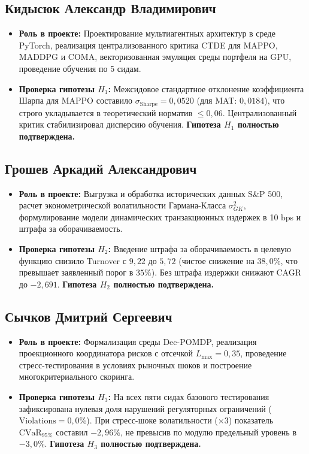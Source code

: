 \documentclass[11pt,a4paper]{article}
\begin{document}
\subsection{Кидысюк Александр Владимирович}
\begin{itemize}[leftmargin=*]
\item \textbf{Роль в проекте:} Проектирование мультиагентных архитектур в среде PyTorch, реализация централизованного критика CTDE для MAPPO, MADDPG и COMA, векторизованная эмуляция среды портфеля на GPU, проведение обучения по 5 сидам.
\item \textbf{Проверка гипотезы $H_1$:} Межсидовое стандартное отклонение коэффициента Шарпа для MAPPO составило $\sigma_{\text{Sharpe}} = 0{,}0520$ (для MAT: $0{,}0184$), что строго укладывается в теоретический норматив $\le 0{,}06$. Централизованный критик стабилизировал дисперсию обучения. \textbf{Гипотеза $H_1$ полностью подтверждена.}
\end{itemize}

\subsection{Грошев Аркадий Александрович}
\begin{itemize}[leftmargin=*]
\item \textbf{Роль в проекте:} Выгрузка и обработка исторических данных S\&P 500, расчет эконометрической волатильности Гармана-Класса $\sigma_{GK}^2$, формулирование модели динамических транзакционных издержек в 10 bps и штрафа за оборачиваемость.
\item \textbf{Проверка гипотезы $H_2$:} Введение штрафа за оборачиваемость в целевую функцию снизило Turnover с $9{,}22$ до $5{,}72$ (чистое снижение на $38{,}0\%$, что превышает заявленный порог в $35\%$). Без штрафа издержки снижают CAGR до $-2{,}691$. \textbf{Гипотеза $H_2$ полностью подтверждена.}
\end{itemize}

\subsection{Сычков Дмитрий Сергеевич}
\begin{itemize}[leftmargin=*]
\item \textbf{Роль в проекте:} Формализация среды Dec-POMDP, реализация проекционного координатора рисков с отсечкой $L_{\max} = 0{,}35$, проведение стресс-тестирования в условиях рыночных шоков и построение многокритериального скоринга.
\item \textbf{Проверка гипотезы $H_3$:} На всех пяти сидах базового тестирования зафиксирована нулевая доля нарушений регуляторных ограничений ($\text{Violations} = 0{,}0\%$). При стресс-шоке волатильности ($\times 3$) показатель $\text{CVaR}_{95\%}$ составил $-2{,}96\%$, не превысив по модулю предельный уровень в $-3{,}0\%$. \textbf{Гипотеза $H_3$ полностью подтверждена.}
\end{itemize}
\end{document}
